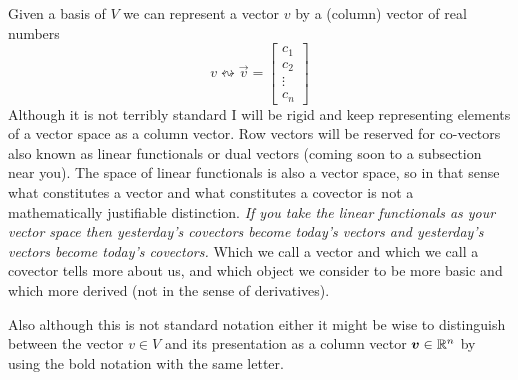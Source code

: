 \documentclass[12pt]{amsart}
\begin{document}
Given a basis of $V$ we can represent a vector $v$ by a (column) vector of real numbers
\begin{equation}\label{eq:ebasisrep}
	v \leftrightsquigarrow \vec{v} = \begin{bmatrix} c_1\\ c_2\\ \vdots \\ c_n \end{bmatrix}
\end{equation}
Although it is not terribly standard I will be rigid and keep representing elements of a vector space as a column vector. Row vectors will be reserved for co-vectors also known as linear functionals or dual vectors (coming soon to a subsection near you). The space of linear functionals is also a vector space, so in that sense what constitutes a vector and what constitutes a covector is not a mathematically justifiable distinction. \emph{If you take the linear functionals as your vector space then yesterday's covectors become today's vectors and yesterday's vectors become today's covectors.} Which we call a vector and which we call a covector tells more about us, and which object we consider to be more basic and which more derived (not in the sense of derivatives). 

Also although this is not standard notation either it might be wise to distinguish between the vector $v\in V$ and its presentation as a column vector $\mathbf{\boldsymbol{v}} \in \mathbb{R}^n$ by using the bold notation with the same letter. 
\end{document}
